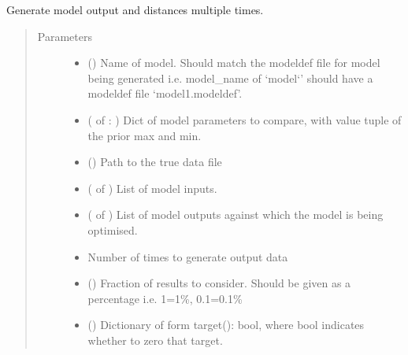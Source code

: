 \documentclass[letterpaper,10pt,english]{sphinxmanual}
\begin{document}
\begin{fulllineitems}
\label{\detokenize{misc:bayescmd.results_handling.plot_repeated_outputs}}
Generate model output and distances multiple times.
\begin{quote}\begin{description}
\item[{Parameters}] \leavevmode\begin{itemize}
\item {} 
 () \textendash{} Name of model. Should match the modeldef file for model being generated
i.e. model\_name of ‘model{}`’ should have a modeldef file
‘model1.modeldef’.

\item {} 
 ( of : ) \textendash{} Dict of model parameters to compare, with value tuple of the prior max
and min.

\item {} 
 () \textendash{} Path to the true data file

\item {} 
 ( of ) \textendash{} List of model inputs.

\item {} 
 ( of ) \textendash{} List of model outputs against which the model is being optimised.

\item {} 
 \textendash{} Number of times to generate output data

\item {} 
 () \textendash{} Fraction of results to consider. Should be given as a percentage i.e.
1=1\%, 0.1=0.1\%

\item {} 
 () \textendash{} 
Dictionary of form target(): bool, where bool indicates
whether to zero that target.


\end{itemize}
\end{description}
\end{quote}
\end{fulllineitems}
\end{document}
